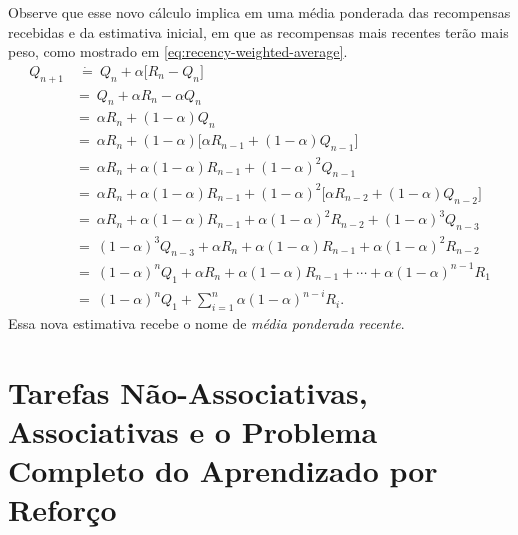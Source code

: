 \documentclass{article}
\begin{document}
        Observe que esse novo cálculo implica em uma média ponderada das recompensas recebidas e da estimativa inicial, em que as recompensas mais recentes terão mais peso, como mostrado em \eqref{eq:recency-weighted-average}.
        \begin{subequations}
        \begin{align}
            Q_{n+1} & \ \dot{=} \ Q_n + \alpha \Big[ R_n - Q_n \Big] \nonumber\\
            & = \ Q_n + \alpha R_n - \alpha Q_n \nonumber\\
            & = \ \alpha R_n + (1 - \alpha) Q_n \nonumber\\
            & = \ \alpha R_n + (1 - \alpha) \Big[ \alpha R_{n-1} + (1 - \alpha) Q_{n-1} \Big] \nonumber\\
            & = \ \alpha R_n + \alpha (1 - \alpha) R_{n-1} + (1 - \alpha)^2 Q_{n-1} \nonumber\\
            & = \ \alpha R_n + \alpha (1 - \alpha) R_{n-1} + (1 - \alpha)^2 \Big[ \alpha R_{n-2} + (1 - \alpha) Q_{n-2} \Big] \nonumber\\
            & = \ \alpha R_n + \alpha (1 - \alpha) R_{n-1} + \alpha (1 - \alpha)^2 R_{n-2} + (1 - \alpha)^3 Q_{n-3} \nonumber\\
            & = \ (1 - \alpha)^3 Q_{n-3} + \alpha R_n + \alpha (1 - \alpha) R_{n-1} + \alpha (1 - \alpha)^2 R_{n-2} \nonumber\\
            & = \ (1 - \alpha)^n Q_1 + \alpha R_n + \alpha (1 - \alpha) R_{n-1} + \cdots + \alpha (1 - \alpha)^{n-1} R_1 \nonumber\\
            & = \ (1 - \alpha)^n Q_1 + \sum_{i=1}^{n} \alpha (1 - \alpha)^{n - i} R_i .
        \end{align}
        \label{eq:recency-weighted-average}
        \end{subequations}
        Essa nova estimativa recebe o nome de \emph{média ponderada recente}.
        
            
            
    \section{Tarefas Não-Associativas, Associativas e o Problema Completo do Aprendizado por Reforço}
\end{document}
